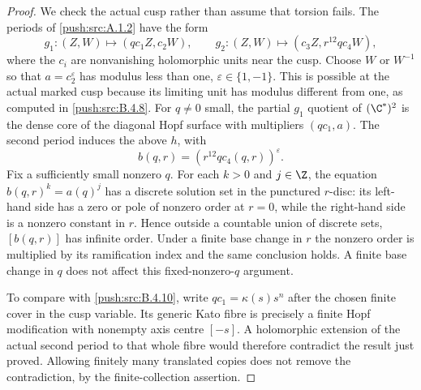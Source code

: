 \begin{proof}
We check the actual cusp rather than assume that torsion fails.
The periods of \ref{push:src:A.1.2} have the form
\[
 g_1:(Z,W)\longmapsto(q c_1 Z,c_2W),\qquad
 g_2:(Z,W)\longmapsto(c_3Z,r^{12}q c_4 W),
\]
where the $c_i$ are nonvanishing holomorphic units near the cusp.
Choose $W$ or $W^{-1}$ so that
$a=c_2^{\varepsilon}$ has modulus less than one,
$\varepsilon\in\{1,-1\}$.
This is possible at the actual marked cusp because its limiting
unit has modulus different from one, as computed in \ref{push:src:B.4.8}.
For $q\ne0$ small, the partial $g_1$ quotient of $(\C^*)^2$
is the dense core of the diagonal Hopf surface with multipliers
$(q c_1,a)$. The second period induces the above $h$, with
\[
 b(q,r)=(r^{12}q c_4(q,r))^{\varepsilon}.
\]
Fix a sufficiently small nonzero $q$. For each $k>0$ and
$j\in\Z$, the equation $b(q,r)^k=a(q)^j$ has a discrete
solution set in the punctured $r$-disc: its left-hand side has
a zero or pole of nonzero order at $r=0$, while the right-hand
side is a nonzero constant in $r$.
Hence outside a countable union of discrete sets, $[b(q,r)]$
has infinite order. Under a finite base change in $r$ the
nonzero order is multiplied by its ramification index and
the same conclusion holds. A finite base change in $q$ does
not affect this fixed-nonzero-$q$ argument.

To compare with \ref{push:src:B.4.10}, write $q c_1=\kappa(s)s^n$ after
the chosen finite cover in the cusp variable. Its generic Kato
fibre is precisely a finite Hopf modification with nonempty
axis centre $[-s]$. A holomorphic extension of the actual second
period to that whole fibre would therefore contradict the result
just proved. Allowing finitely many translated copies does not
remove the contradiction, by the finite-collection assertion.
\end{proof}


